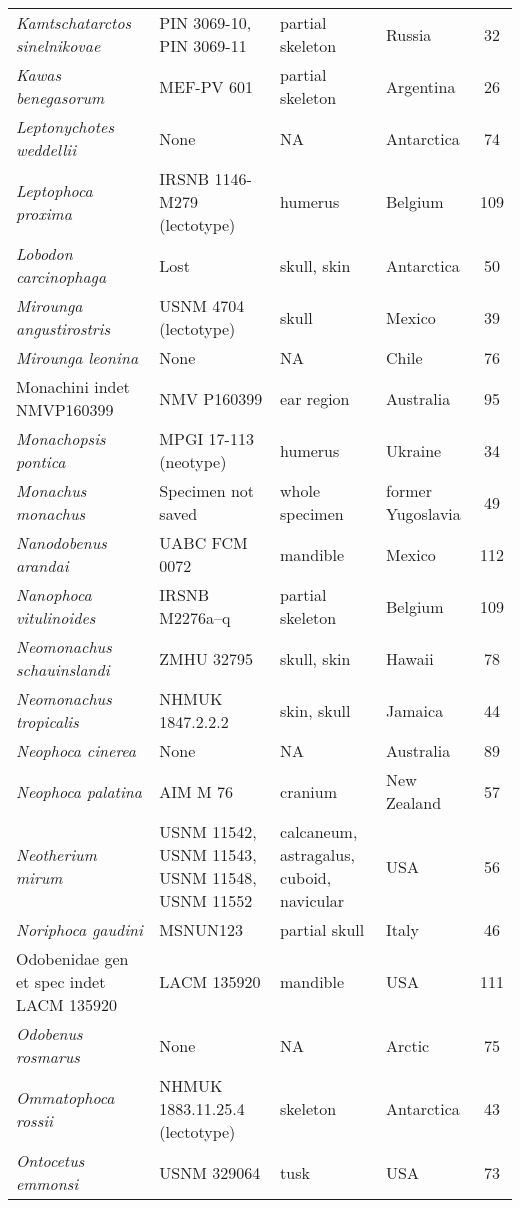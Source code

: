 \begin{longtable}{p{}p{}p{}lc}
\textit{Kamtschatarctos sinelnikovae} &	PIN 3069-10, PIN 3069-11 & 	partial skeleton & 	Russia & 32\\
\textit{Kawas benegasorum} &	MEF-PV 601 & 	partial skeleton & 	Argentina & 26\\
\textit{Leptonychotes weddellii} &	None & 	NA & 	Antarctica & 74\\
\textit{Leptophoca proxima} &	IRSNB 1146-M279 (lectotype) & 	humerus & 	Belgium & 109\\
\textit{Lobodon carcinophaga} &	Lost & 	skull, skin & 	Antarctica & 50\\
\textit{Mirounga angustirostris} &	USNM 4704 (lectotype) & 	skull & 	Mexico & 39\\
\textit{Mirounga leonina} &	None & 	NA & 	Chile & 76\\
Monachini indet NMVP160399	& NMV P160399 & 	ear region & 	Australia & 95\\
\textit{Monachopsis pontica} & MPGI 17-113 (neotype) & humerus & Ukraine & 34\\
\textit{Monachus monachus} &	Specimen not saved & 	whole specimen & 	former Yugoslavia & 49\\
\textit{Nanodobenus arandai} &	UABC FCM 0072 & 	mandible & 	Mexico & 112\\
\textit{Nanophoca vitulinoides} &	IRSNB M2276a–q & 	partial skeleton & 	Belgium & 109\\
\textit{Neomonachus schauinslandi} &	ZMHU 32795 & 	skull, skin & 	Hawaii & 78\\
\textit{Neomonachus tropicalis} &	NHMUK 1847.2.2.2 & 	skin, skull & 	Jamaica & 44\\
\textit{Neophoca cinerea} &	None & 	NA & 	Australia & 89\\
\textit{Neophoca palatina} &	AIM M 76 & 	cranium & 	New Zealand & 57\\
\textit{Neotherium mirum} &	USNM 11542, USNM 11543, USNM 11548, USNM 11552 & calcaneum, astragalus, cuboid, navicular & 	USA & 56\\
\textit{Noriphoca gaudini} & MSNUN123 & 	partial skull & 	Italy & 46\\
Odobenidae gen et spec indet LACM 135920 &	LACM 135920 & 	mandible & 	USA & 111\\
\textit{Odobenus rosmarus} &	None & 	NA & 	Arctic & 75\\
\textit{Ommatophoca rossii} &	NHMUK 1883.11.25.4 (lectotype) & 	skeleton & 	Antarctica & 43\\
\textit{Ontocetus emmonsi} &	USNM 329064 & 	tusk & 	USA & 73\\

\end{longtable}
